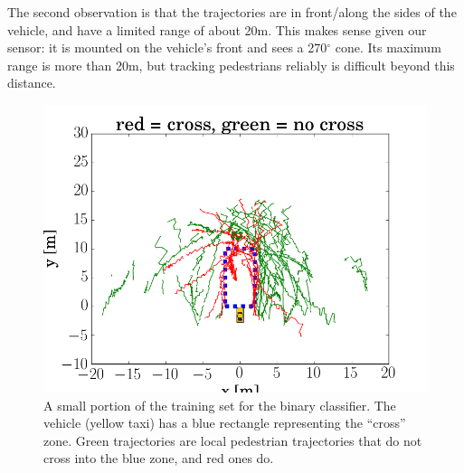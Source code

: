 The second observation is that the trajectories are in front/along the sides of the vehicle, and have a limited range of about 20m.
This makes sense given our sensor: it is mounted on the vehicle's front and sees a 270$^{\circ}$ cone.
Its maximum range is more than 20m, but tracking pedestrians reliably is difficult beyond this distance.

\begin{figure}
	\centering
	\includegraphics [trim=0 0 0 0, clip, angle=0, width=0.8\columnwidth,
	keepaspectratio]{figures/training_set}
	\caption{A small portion of the training set for the binary classifier. The vehicle (yellow taxi) has a blue rectangle representing the ``cross'' zone. Green trajectories are local pedestrian trajectories that do not cross into the blue zone, and red ones do.} 
	\label{fig:training_set} 
\end{figure}



